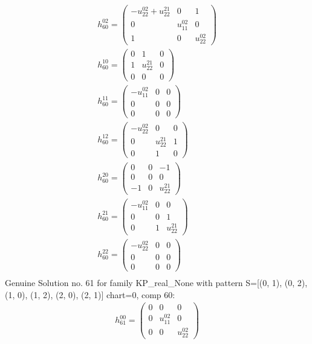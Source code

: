 \documentclass[a4paper, 11pt, twoside, onecolumn]{article}
\begin{document}
\begin{landscape}
\begin{gather*}
	 h_{60}^{02}=\begin{pmatrix}- u^{02}_{22} + u^{21}_{22} & 0 & 1\\0 & u^{02}_{11} & 0\\1 & 0 & u^{02}_{22}\end{pmatrix}\\ 
	 h_{60}^{10}=\begin{pmatrix}0 & 1 & 0\\1 & u^{21}_{22} & 0\\0 & 0 & 0\end{pmatrix}\\ 
	 h_{60}^{11}=\begin{pmatrix}- u^{02}_{11} & 0 & 0\\0 & 0 & 0\\0 & 0 & 0\end{pmatrix}\\ 
	 h_{60}^{12}=\begin{pmatrix}- u^{02}_{22} & 0 & 0\\0 & u^{21}_{22} & 1\\0 & 1 & 0\end{pmatrix}\\ 
	 h_{60}^{20}=\begin{pmatrix}0 & 0 & -1\\0 & 0 & 0\\-1 & 0 & u^{21}_{22}\end{pmatrix}\\ 
	 h_{60}^{21}=\begin{pmatrix}- u^{02}_{11} & 0 & 0\\0 & 0 & 1\\0 & 1 & u^{21}_{22}\end{pmatrix}\\ 
	 h_{60}^{22}=\begin{pmatrix}- u^{02}_{22} & 0 & 0\\0 & 0 & 0\\0 & 0 & 0\end{pmatrix}\\ 
\end{gather*} 
Genuine Solution no. 61 for family KP_real_None with pattern S=[(0, 1), (0, 2), (1, 0), (1, 2), (2, 0), (2, 1)] chart=0, comp 60: 
\begin{gather*} 
	 h_{61}^{00}=\begin{pmatrix}0 & 0 & 0\\0 & u^{02}_{11} & 0\\0 & 0 & u^{02}_{22}\end{pmatrix}\\ 

\end{gather*}
\end{landscape}
\end{document}
